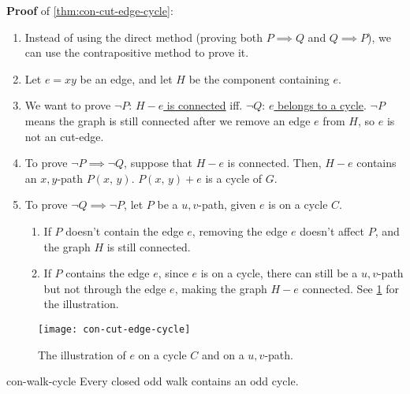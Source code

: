 \documentclass[../src/handouts/main.tex]{subfiles}
\begin{document}
\textbf{Proof} of \cref{thm:con-cut-edge-cycle}:
\begin{enumerate}
  \item Instead of using the direct method (proving both $P \implies Q$ and $Q \implies P$), we can use the contrapositive method to prove it.
  \item Let $e = xy$ be an edge, and let $H$ be the component containing $e$.
  \item We want to prove $\neg P$: \underline{$H-e$ is connected} iff. $\neg Q$: \underline{$e$ belongs to a cycle}. $\neg P$ means the graph is still connected after we remove an edge $e$ from $H$, so $e$ is not an cut-edge.
  \item To prove $\neg P \implies \neg Q$, suppose that $H-e$ is connected. Then, $H-e$ contains an $x,y$-path $P(x,\, y)$. $P(x,\, y) + e$ is a cycle of $G$.
  \item To prove $\neg Q \implies \neg P$, let $P$ be a $u,v$-path, given $e$ is on a cycle $C$.
        \begin{enumerate}
          \item If $P$ doesn't contain the edge $e$, removing the edge $e$ doesn't affect $P$, and the graph $H$ is still connected.
          \item If $P$ contains the edge $e$, since $e$ is on a cycle, there can still be a $u,v$-path but not through the edge $e$, making the graph $H-e$ connected. See \cref{fig:con-cut-edge-cycle} for the illustration.
        \end{enumerate}
\end{enumerate}

\begin{figure}[htbp]
  \centering
  \texttt{[image: con-cut-edge-cycle]}
  \caption{The illustration of $e$ on a cycle $C$ and on a $u,v$-path.}
  \label{fig:con-cut-edge-cycle}
\end{figure}

\begin{lemma}{}{con-walk-cycle}
  Every closed odd walk contains an odd cycle.
\end{lemma}
\end{document}
